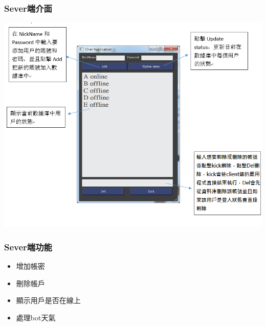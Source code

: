 \documentclass[utf8x]{beamer}
\begin{document}
\begin{frame}
\frametitle{\huge Sever端介面} %
\hspace{3.5cm} \includegraphics[scale=0.4]{serverui}
\end{frame}

\begin{frame}[t]
\frametitle{\huge Sever端功能} %
\begin{itemize}
\Large \item 增加帳密
\item 刪除帳戶
\item 顯示用戶是否在線上
\item 處理bot天氣
\end{itemize}
\end{frame}
\end{document}
